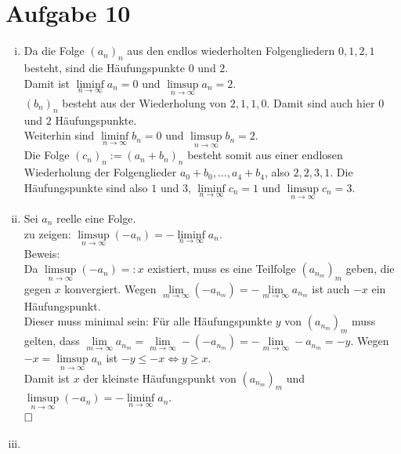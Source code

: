 \documentclass[12pt,a4paper]{article}
\newcommand{\qed}{\null\nobreak\hfill\square}
\begin{document}
\section*{Aufgabe 10}

\begin{enumerate}[(i)]
    \item Da die Folge $(a_n)_n$ aus den endlos wiederholten Folgengliedern $0, 1, 2, 1$ besteht, sind die Häufungspunkte $0$ und $2$.\\
    Damit ist $\liminf\limits_{n \to \infty} a_n = 0$ und $\limsup\limits_{n \to \infty} a_n = 2$.\\

    $(b_n)_n$ besteht aus der Wiederholung von $2, 1, 1, 0$.
    Damit sind auch hier $0$ und $2$ Häufungspunkte.\\
    Weiterhin sind $\liminf\limits_{n \to \infty} b_n = 0$ und $\limsup\limits_{n \to \infty} b_n = 2$.\\

    Die Folge $(c_n)_n := (a_n + b_n)_n$ besteht somit aus einer endlosen Wiederholung der Folgenglieder $a_0 + b_0, \dots, a_4 + b_4$, also $2, 2, 3, 1$.
    Die Häufungspunkte sind also $1$ und $3$, $\liminf\limits_{n \to \infty} c_n = 1$ und $\limsup\limits_{n \to \infty} c_n = 3$.

    \item Sei $a_n$ reelle eine Folge.\\
    zu zeigen: $\limsup\limits_{n \to \infty} (-a_n) = -\liminf\limits_{n \to \infty} a_n$.\\
    Beweis:\\
    Da $\limsup\limits_{n \to \infty} (-a_n) =: x$ existiert, muss es eine Teilfolge $(a_{n_m})_m$ geben, die gegen $x$ konvergiert.
    Wegen $\lim\limits_{m \to \infty} (-a_{n_m}) = - \lim\limits_{m \to \infty} a_{n_m}$ ist auch $-x$ ein Häufungspunkt.\\
    Dieser muss minimal sein:
    Für alle Häufungspunkte $y$ von $(a_{n_m})_m$ muss gelten, dass $\lim\limits_{m \to \infty} a_{n_m} = \lim\limits_{m \to \infty} -(-a_{n_m}) = - \lim\limits_{m \to \infty} -a_{n_m} = -y$.
    Wegen $-x = \limsup\limits_{n \to \infty} a_n$ ist $-y \leq -x \Leftrightarrow y \geq x$.\\
    Damit ist $x$ der kleinste Häufungspunkt von $(a_{n_m})_m$ und $\limsup\limits_{n \to \infty} (-a_n) = - \liminf\limits_{n \to \infty} a_n$.\\
    $\qed$

    \item
\end{enumerate}
\end{document}
